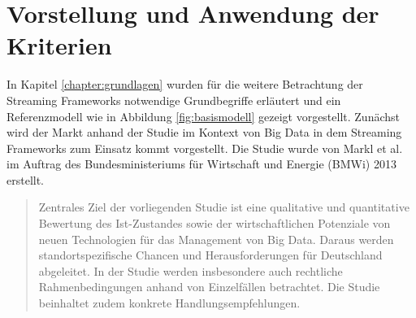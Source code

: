 \chapter{Vorstellung und Anwendung der Kriterien}
\label{chapter:kriterien}

In Kapitel \ref{chapter:grundlagen} wurden für die weitere Betrachtung der Streaming Frameworks notwendige Grundbegriffe erläutert und ein Referenzmodell wie in Abbildung \ref{fig:basismodell} gezeigt vorgestellt. Zunächst wird der Markt anhand der Studie  im Kontext von Big Data in dem Streaming Frameworks zum Einsatz kommt vorgestellt. Die Studie  wurde von Markl et al. im Auftrag des Bundesministeriums für Wirtschaft und Energie (BMWi) 2013 erstellt. 

\begin{quote}
Zentrales Ziel der vorliegenden Studie ist eine qualitative und quantitative Bewertung des Ist-Zustandes sowie der wirtschaftlichen Potenziale von neuen Technologien für das Management von Big Data. Daraus werden standortspezifische Chancen und Herausforderungen für Deutschland abgeleitet. In der Studie werden insbesondere auch rechtliche Rahmenbedingungen anhand von Einzelfällen betrachtet. Die Studie beinhaltet zudem konkrete Handlungsempfehlungen. 
\end{quote}

